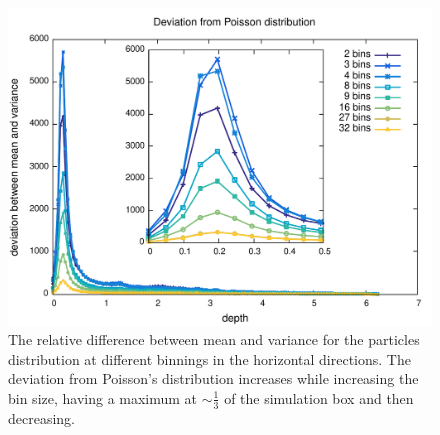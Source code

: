 \begin{figure}[h]
    \includegraphics[width=\textwidth]{data/3D_model/run2/dev_poisson_1}
    \caption{The relative difference between mean and variance for the particles distribution at different binnings in the horizontal directions. The deviation from Poisson's distribution increases while increasing the bin size, having a maximum at $\sim\frac{1}{3}$ of the simulation box and then decreasing.}
    \label{fig:lag_res_random}
\end{figure}